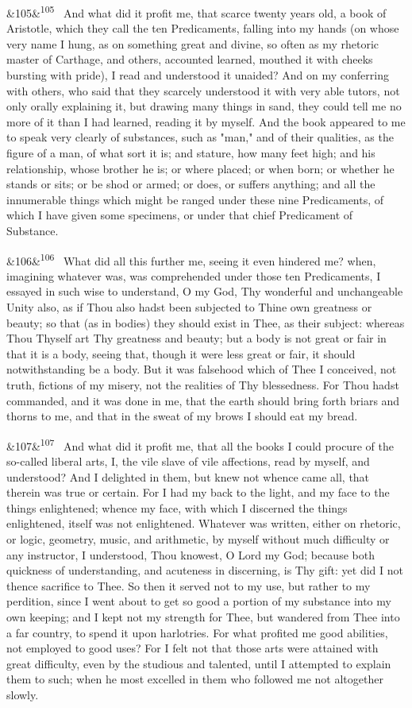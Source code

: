 \documentclass[12pt]{article}
\newcommand{\para}[1][]{\par\noindent\ifx&#1&\else\textsuperscript{\footnotesize #1}~\fi}
\begin{document}
\para[105] And what did it profit me, that scarce twenty years old, a book of Aristotle, which they call the ten Predicaments, falling into my hands (on whose very name I hung, as on something great and divine, so often as my rhetoric master of Carthage, and others, accounted learned, mouthed it with cheeks bursting with pride), I read and understood it unaided? And on my conferring with others, who said that they scarcely understood it with very able tutors, not only orally explaining it, but drawing many things in sand, they could tell me no more of it than I had learned, reading it by myself. And the book appeared to me to speak very clearly of substances, such as "man," and of their qualities, as the figure of a man, of what sort it is; and stature, how many feet high; and his relationship, whose brother he is; or where placed; or when born; or whether he stands or sits; or be shod or armed; or does, or suffers anything; and all the innumerable things which might be ranged under these nine Predicaments, of which I have given some specimens, or under that chief Predicament of Substance.

\para[106] What did all this further me, seeing it even hindered me? when, imagining whatever was, was comprehended under those ten Predicaments, I essayed in such wise to understand, O my God, Thy wonderful and unchangeable Unity also, as if Thou also hadst been subjected to Thine own greatness or beauty; so that (as in bodies) they should exist in Thee, as their subject: whereas Thou Thyself art Thy greatness and beauty; but a body is not great or fair in that it is a body, seeing that, though it were less great or fair, it should notwithstanding be a body. But it was falsehood which of Thee I conceived, not truth, fictions of my misery, not the realities of Thy blessedness. For Thou hadst commanded, and it was done in me, that the earth should bring forth briars and thorns to me, and that in the sweat of my brows I should eat my bread.

\para[107] And what did it profit me, that all the books I could procure of the so-called liberal arts, I, the vile slave of vile affections, read by myself, and understood? And I delighted in them, but knew not whence came all, that therein was true or certain. For I had my back to the light, and my face to the things enlightened; whence my face, with which I discerned the things enlightened, itself was not enlightened. Whatever was written, either on rhetoric, or logic, geometry, music, and arithmetic, by myself without much difficulty or any instructor, I understood, Thou knowest, O Lord my God; because both quickness of understanding, and acuteness in discerning, is Thy gift: yet did I not thence sacrifice to Thee. So then it served not to my use, but rather to my perdition, since I went about to get so good a portion of my substance into my own keeping; and I kept not my strength for Thee, but wandered from Thee into a far country, to spend it upon harlotries. For what profited me good abilities, not employed to good uses? For I felt not that those arts were attained with great difficulty, even by the studious and talented, until I attempted to explain them to such; when he most excelled in them who followed me not altogether slowly.
\end{document}
